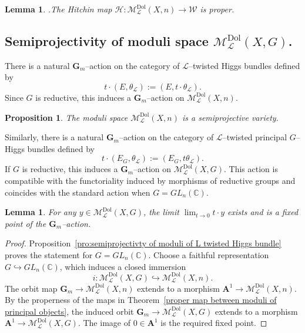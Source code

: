 \documentclass[12pt,reqno]{amsart}
\numberwithin{equation}{subsection}
\newtheorem{lem}[equation]{Lemma}
\newtheorem{proposition}[equation]{Proposition}
\theoremstyle{definition}
\theoremstyle{theorem}
\begin{document}
\begin{lem}\cite[\S\,2, Lem.~2.4]{Alfaya-Oliveire-2024}.\label{lem:proper Hitchin map for ML(X,n)}
	The Hitchin map $
	\mathcal{H}:
	\mathcal{M}^{\mathrm{Dol}}_{\mathcal{L}}(X,n)\longrightarrow \mathcal{W}$ is proper.
\end{lem}




\subsection{Semiprojectivity of moduli space $\mathcal{M}_{\mathcal{L}}^{\text{Dol}}(X,G)$.}
There is a natural $\mathbf{G}_{m}$--action on the category of
$\mathcal{L}$--twisted Higgs bundles defined by
\[
t\cdot (E,\theta_{\mathcal{L}}):=(E,t\cdot\theta_{\mathcal{L}}).
\]
Since $G$ is reductive, this induces a $\mathbf{G}_{m}$--action on
$\mathcal{M}^{\mathrm{Dol}}_{\mathcal{L}}(X,n)$.

\begin{proposition}\cite[\S\,4, Prop. 4.4]{Alfaya-Oliveire-2024}\label{pro:semiprojectivty of moduli of L twisted Higgs bundle}
	The moduli space $\mathcal{M}^{\mathrm{Dol}}_{\mathcal{L}}(X,n)$
	is a semiprojective variety.
\end{proposition}

Similarly, there is a natural $\mathbf{G}_{m}$--action on the category of
$\mathcal{L}$--twisted principal $G$--Higgs bundles defined by
\[
t\cdot (E_{G},\theta_{\mathcal{L}}):=(E_{G},t\theta_{\mathcal{L}}).
\]
If $G$ is reductive, this induces a $\mathbf{G}_{m}$--action on
$\mathcal{M}^{\mathrm{Dol}}_{\mathcal{L}}(X,G)$.
This action is compatible with the functoriality induced by morphisms of
reductive groups and coincides with the standard action when
$G=GL_{n}(\mathbb{C})$.

\begin{lem}\label{limit exist for MLDOL of PB}
	For any $y\in \mathcal{M}^{\mathrm{Dol}}_{\mathcal{L}}(X,G)$,
	the limit $
	\lim_{t\to 0} t\cdot y$ 
	exists and is a fixed point of the $\mathbf{G}_{m}$--action.
\end{lem}

\begin{proof}
	Proposition~\eqref{pro:semiprojectivty of moduli of L twisted Higgs bundle}
	proves the statement for $G=GL_{n}(\mathbb{C})$.
	Choose a faithful representation
	$G\hookrightarrow GL_{n}(\mathbb{C})$, which induces a closed immersion
	\[
	i:\mathcal{M}^{\mathrm{Dol}}_{\mathcal{L}}(X,G)
	\hookrightarrow
	\mathcal{M}^{\mathrm{Dol}}_{\mathcal{L}}(X,n).
	\]
	The orbit map
	$\mathbf{G}_{m}\to \mathcal{M}^{\mathrm{Dol}}_{\mathcal{L}}(X,n)$
	extends to a morphism
	$\mathbf{A}^{1}\to \mathcal{M}^{\mathrm{Dol}}_{\mathcal{L}}(X,n)$.
	By the properness of the maps in
	Theorem~\ref{proper map between moduli of principal objects},
	the induced orbit
	$\mathbf{G}_{m}\to \mathcal{M}^{\mathrm{Dol}}_{\mathcal{L}}(X,G)$
	extends to a morphism
	$\mathbf{A}^{1}\to \mathcal{M}^{\mathrm{Dol}}_{\mathcal{L}}(X,G)$.
	The image of $0\in\mathbf{A}^{1}$ is the required fixed point.
\end{proof}
\end{document}
